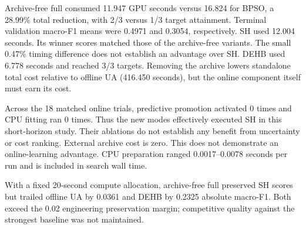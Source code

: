\begin{table}[!t]\centering\caption{Fresh target 0.6 runs, means across three search seeds. GPU seconds are measured; archive cost is charged to a standalone search. All misses are retained. Hits count actual terminal targets before the strict horizon.}\label{tab:online-quality}
\end{table}

Archive-free full consumed 11.947 GPU seconds versus 16.824 for BPSO, a 28.99\% total reduction, with 2/3 versus 1/3 target attainment. Terminal validation macro-F1 means were 0.4971 and 0.3054, respectively. SH used 12.004 seconds. Its winner scores matched those of the archive-free variants. The small 0.47\% timing difference does not establish an advantage over SH. DEHB used 6.778 seconds and reached 3/3 targets. Removing the archive lowers standalone total cost relative to offline UA (416.450 seconds), but the online component itself must earn its cost.

Across the 18 matched online trials, predictive promotion activated 0 times and CPU fitting ran 0 times. Thus the new modes effectively executed SH in this short-horizon study. Their ablations do not establish any benefit from uncertainty or cost ranking. External archive cost is zero. This does not demonstrate an online-learning advantage. CPU preparation ranged 0.0017--0.0078 seconds per run and is included in search wall time.

With a fixed 20-second compute allocation, archive-free full preserved SH scores but trailed offline UA by 0.0361 and DEHB by 0.2325 absolute macro-F1. Both exceed the 0.02 engineering preservation margin; competitive quality against the strongest baseline was not maintained.

